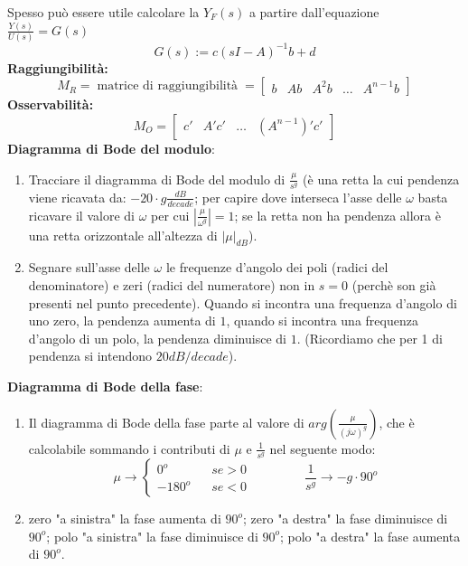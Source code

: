 Spesso può essere utile calcolare la $Y_F(s)$ a partire dall'equazione $\frac{Y(s)}{U(s)} = G(s)$
\[
    G(s) := c(sI-A)^{-1} b + d
\]
\textbf{Raggiungibilità:}
\[
    M_R= \;\text{matrice di raggiungibilità}\; =\left[\begin{matrix}
        b & Ab & A^2 b & \dots & A^{n-1}b
    \end{matrix}\right]
\] 
\textbf{Osservabilità:}
\[
    M_O = \left[\begin{matrix}
        c' & A'c' & \dots & (A^{n-1})' c'
    \end{matrix}\right]
\]
\textbf{Diagramma di Bode del modulo}: 
\begin{enumerate}
    \item Tracciare il diagramma di Bode del modulo di $\frac{\mu}{s^g}$ (è una retta la cui pendenza viene ricavata da: $-20 \cdot g \frac{dB}{decade}$; per capire dove interseca l'asse delle $\omega$ basta ricavare il valore di $\omega$ per cui $\left| \frac{\mu}{\omega^g} \right| = 1$; se la retta non ha pendenza allora è una retta orizzontale all'altezza di $|\mu|_{dB}$).
    \item Segnare sull'asse delle $\omega$ le frequenze d'angolo dei poli (radici del denominatore) e zeri (radici del numeratore) non in $s=0$ (perchè son già presenti nel punto precedente).\newline
    Quando si incontra una frequenza d'angolo di uno zero, la pendenza aumenta di $1$, quando si incontra una frequenza d'angolo di un polo, la pendenza diminuisce di $1$. (Ricordiamo che per 1 di pendenza si intendono $20 dB/decade$).
\end{enumerate}
\textbf{Diagramma di Bode della fase}:
\begin{enumerate}
    \item Il diagramma di Bode della fase parte al valore di $arg(\frac{\mu}{(j \omega)^g})$, che è calcolabile sommando i contributi di $\mu$ e $\frac{1}{s^g}$ nel seguente modo:
    \[
        \mu \rightarrow \begin{cases}
            0^o \;\;\;& se > 0\\
            -180^o \;\;\; & se <0
        \end{cases} \;\;\;\;\;\;\;\;\;\;\;\;\;\;\; \frac{1}{s^g}\rightarrow -g \cdot 90^o
    \]
    \item zero "a sinistra" la fase aumenta di $90^o$;\newline
    zero "a destra" la fase diminuisce di $90^o$;\newline
    polo "a sinistra" la fase diminuisce di $90^o$;\newline
    polo "a destra" la fase aumenta di $90^o$.
\end{enumerate}
